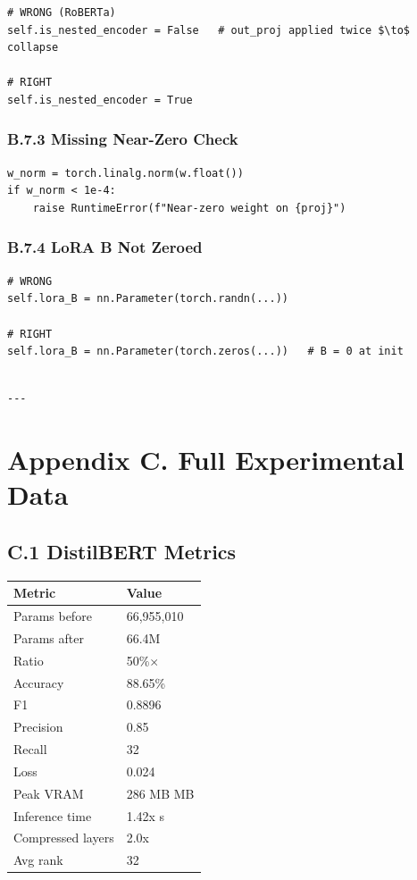 \begin{lstlisting}
# WRONG (RoBERTa)
self.is_nested_encoder = False   # out_proj applied twice $\to$ collapse

# RIGHT
self.is_nested_encoder = True
\end{lstlisting}

\subsubsection{B.7.3 Missing Near-Zero Check}

\begin{lstlisting}
w_norm = torch.linalg.norm(w.float())
if w_norm < 1e-4:
    raise RuntimeError(f"Near-zero weight on {proj}")
\end{lstlisting}

\subsubsection{B.7.4 LoRA B Not Zeroed}

\begin{lstlisting}
# WRONG
self.lora_B = nn.Parameter(torch.randn(...))

# RIGHT
self.lora_B = nn.Parameter(torch.zeros(...))   # B = 0 at init
\end{lstlisting}
\begin{lstlisting}

---
\end{lstlisting}


\section{Appendix C. Full Experimental Data}

\subsection{C.1 DistilBERT Metrics}

\begin{table}[H]
\centering
\small
\begin{tabular}{ll}
\toprule
\textbf{Metric} & \textbf{Value} \\
\midrule
Params before & 66,955,010 \\
Params after & 66.4M \\
Ratio & 50\%$\times$ \\
Accuracy & 88.65\% \\
F1 & 0.8896 \\
Precision & 0.85 \\
Recall & 32 \\
Loss & 0.024 \\
Peak VRAM & 286 MB MB \\
Inference time & 1.42x s \\
Compressed layers & 2.0x \\
Avg rank & 32 \\
\bottomrule
\end{tabular}
\end{table}

